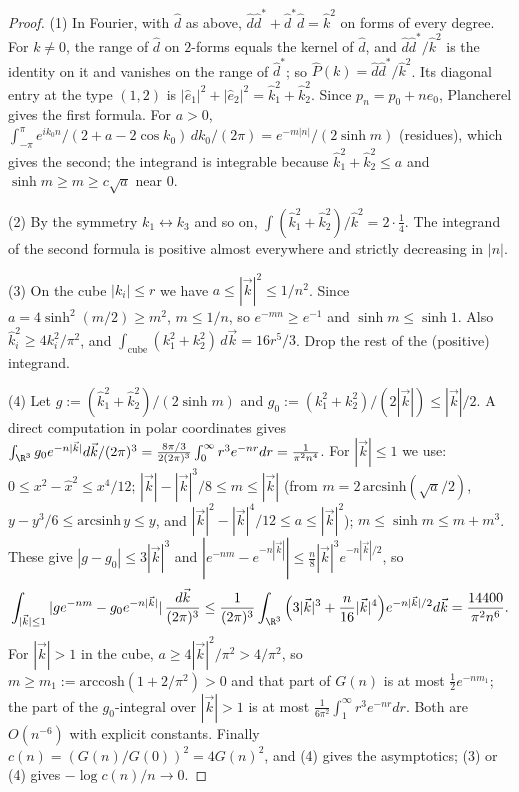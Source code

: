 \begin{proof}
(1) In Fourier, with $\hat d$ as above, $\hat d\hat d^*+\hat d^*\hat d=\hat k^2$ on forms of every degree. For $k\ne0$, the range of $\hat d$ on $2$-forms equals the kernel of $\hat d$, and $\hat d\hat d^*/\hat k^2$ is the identity on it and vanishes on the range of $\hat d^*$; so $\hat P(k)=\hat d\hat d^*/\hat k^2$. Its diagonal entry at the type $(1,2)$ is $|\hat e_1|^2+|\hat e_2|^2=\hat k_1^2+\hat k_2^2$. Since $p_n=p_0+ne_0$, Plancherel gives the first formula. For $a>0$, $\int_{-\pi}^\pi e^{ik_0n}/(2+a-2\cos k_0)\,dk_0/(2\pi)=e^{-m|n|}/(2\sinh m)$ (residues), which gives the second; the integrand is integrable because $\hat k_1^2+\hat k_2^2\le a$ and $\sinh m\ge m\ge c\sqrt a$ near $0$.

(2) By the symmetry $k_1\leftrightarrow k_3$ and so on, $\int(\hat k_1^2+\hat k_2^2)/\hat k^2=2\cdot\frac14$. The integrand of the second formula is positive almost everywhere and strictly decreasing in $|n|$.

(3) On the cube $|k_i|\le r$ we have $a\le|\vec k|^2\le1/n^2$. Since $a=4\sinh^2(m/2)\ge m^2$, $m\le1/n$, so $e^{-mn}\ge e^{-1}$ and $\sinh m\le\sinh1$. Also $\hat k_i^2\ge4k_i^2/\pi^2$, and $\int_{\text{cube}}(k_1^2+k_2^2)\,d\vec k=16r^5/3$. Drop the rest of the (positive) integrand.

(4) Let $g:=(\hat k_1^2+\hat k_2^2)/(2\sinh m)$ and $g_0:=(k_1^2+k_2^2)/(2|\vec k|)\le|\vec k|/2$. A direct computation in polar coordinates gives $\int_{\R^3}g_0e^{-n|\vec k|}d\vec k/(2\pi)^3=\frac{8\pi/3}{2(2\pi)^3}\int_0^\infty r^3e^{-nr}dr=\frac1{\pi^2n^4}$. For $|\vec k|\le1$ we use: $0\le x^2-\hat x^2\le x^4/12$; $|\vec k|-|\vec k|^3/8\le m\le|\vec k|$ (from $m=2\,\mathrm{arcsinh}(\sqrt a/2)$, $y-y^3/6\le\mathrm{arcsinh}\,y\le y$, and $|\vec k|^2-|\vec k|^4/12\le a\le|\vec k|^2$); $m\le\sinh m\le m+m^3$. These give $|g-g_0|\le3|\vec k|^3$ and $|e^{-nm}-e^{-n|\vec k|}|\le\frac n8|\vec k|^3e^{-n|\vec k|/2}$, so
\[
\int_{|\vec k|\le1}|ge^{-nm}-g_0e^{-n|\vec k|}|\,\frac{d\vec k}{(2\pi)^3}\le\frac1{(2\pi)^3}\int_{\R^3}\Big(3|\vec k|^3+\frac n{16}|\vec k|^4\Big)e^{-n|\vec k|/2}d\vec k=\frac{14400}{\pi^2n^6}.
\]
For $|\vec k|>1$ in the cube, $a\ge4|\vec k|^2/\pi^2>4/\pi^2$, so $m\ge m_1:=\mathrm{arccosh}(1+2/\pi^2)>0$ and that part of $G(n)$ is at most $\tfrac12e^{-nm_1}$; the part of the $g_0$-integral over $|\vec k|>1$ is at most $\frac1{6\pi^2}\int_1^\infty r^3e^{-nr}dr$. Both are $O(n^{-6})$ with explicit constants. Finally $c(n)=(G(n)/G(0))^2=4G(n)^2$, and (4) gives the asymptotics; (3) or (4) gives $-\log c(n)/n\to0$.
\end{proof}

